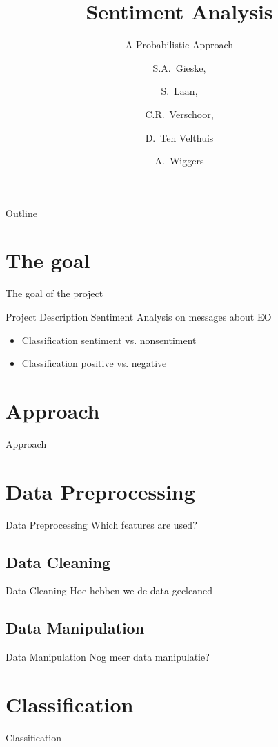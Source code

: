 \documentclass{beamer}
\title[Leren en Beslissen - Sentiment Analisys]
{Sentiment Analysis}
\subtitle{A Probabilistic Approach}
\author[Gieske, Laan, Verschoor, ten Velthuis, Wiggers ] %
{S.A.~Gieske, \and S.~Laan, \and C.R.~Verschoor, \\
\and D.~Ten Velthuis \and A.~Wiggers}
\institute[University of Amsterdam] %
{
  Faculty of Science (FNWI) \\
  University of Amsterdam
  }
\begin{document}
\begin{frame}
  \titlepage
\end{frame}

\begin{frame}{Outline}
  \tableofcontents
\end{frame}


\section{The goal}

\begin{frame}{The goal of the project}
\begin{block}{Project Description}
Sentiment Analysis on messages about EO
\end{block}
\begin{itemize}
\item Classification sentiment vs. nonsentiment
\item Classification positive vs. negative
\end{itemize}
\end{frame}

\section{Approach}
\begin{frame}{Approach}
\end{frame}

\section{Data Preprocessing}
\begin{frame}{Data Preprocessing}
Which features are used?
\end{frame}
\subsection{Data Cleaning}
\begin{frame}{Data Cleaning}
Hoe hebben we de data gecleaned
\end{frame}
\subsection{Data Manipulation}
\begin{frame}{Data Manipulation}
Nog meer data manipulatie?
\end{frame}

\section{Classification}
\begin{frame}{Classification}
\end{frame}
\end{document}
